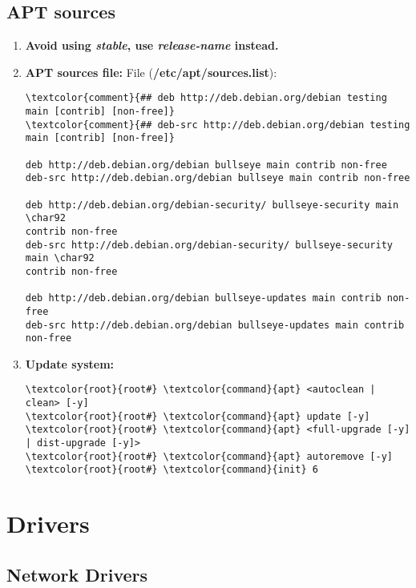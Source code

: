 \documentclass[10pt, a4paper, onecolumn, openany]{book} %
\begin{document}
\section{APT sources}
\begin{enumerate}
    \item \textbf{Avoid using \textit{stable}, use \textit{release-name} instead.}
    \item \textbf{APT sources file:}
\newline File (\textbf{\textcolor{file}{/etc/apt/sources.list}}):
\begin{Verbatim}[commandchars=\\\{\}]
\textcolor{comment}{## deb http://deb.debian.org/debian testing main [contrib] [non-free]}
\textcolor{comment}{## deb-src http://deb.debian.org/debian testing main [contrib] [non-free]}

deb http://deb.debian.org/debian bullseye main contrib non-free
deb-src http://deb.debian.org/debian bullseye main contrib non-free

deb http://deb.debian.org/debian-security/ bullseye-security main \char92
contrib non-free
deb-src http://deb.debian.org/debian-security/ bullseye-security main \char92
contrib non-free

deb http://deb.debian.org/debian bullseye-updates main contrib non-free
deb-src http://deb.debian.org/debian bullseye-updates main contrib non-free
\end{Verbatim}
    \item \textbf{Update system:}
\begin{Verbatim}[commandchars=\\\{\}]
\textcolor{root}{root#} \textcolor{command}{apt} <autoclean | clean> [-y]
\textcolor{root}{root#} \textcolor{command}{apt} update [-y]
\textcolor{root}{root#} \textcolor{command}{apt} <full-upgrade [-y] | dist-upgrade [-y]>
\textcolor{root}{root#} \textcolor{command}{apt} autoremove [-y]
\textcolor{root}{root#} \textcolor{command}{init} 6
\end{Verbatim}
\end{enumerate}
\chapter{Drivers}
\section{Network Drivers}
\end{document}
